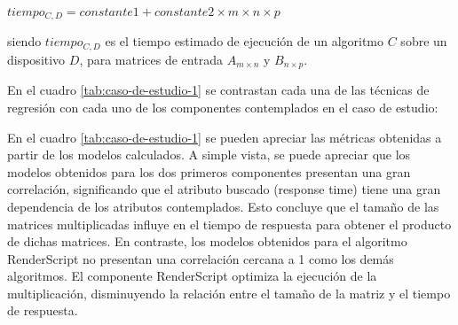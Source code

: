 \begin{center}
$tiempo_{C,D}=constante1+constante2\times m\times n\times p$
\par\end{center}

siendo $tiempo_{C,D}$ es el tiempo estimado de ejecución de un algoritmo
$C$ sobre un dispositivo $D$, para matrices de entrada $A_{m\times n}$
y $B_{n\times p}$.

En el cuadro \ref{tab:caso-de-estudio-1} se contrastan cada una de
las técnicas de regresión con cada uno de los componentes contemplados
en el caso de estudio:

\begin{table}[H]
\begin{doublespace}
\begin{centering}
\par\end{centering}
\end{doublespace}

\caption{Resultados obtenidos del primer caso de estudio. \label{tab:caso-de-estudio-1}}
\end{table}


En el cuadro \ref{tab:caso-de-estudio-1} se pueden apreciar las métricas
obtenidas a partir de los modelos calculados. A simple vista, se puede
apreciar que los modelos obtenidos para los dos primeros componentes
presentan una gran correlación, significando que el atributo buscado
(response time) tiene una gran dependencia de los atributos contemplados.
Esto concluye que el tamaño de las matrices multiplicadas influye
en el tiempo de respuesta para obtener el producto de dichas matrices.
En contraste, los modelos obtenidos para el algoritmo RenderScript
no presentan una correlación cercana a 1 como los demás algoritmos.
El componente RenderScript optimiza la ejecución de la multiplicación,
disminuyendo la relación entre el tamaño de la matriz y el tiempo
de respuesta.

